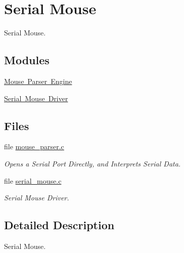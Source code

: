 \hypertarget{group__libmisc__mouse}{}\section{Serial Mouse}
\label{group__libmisc__mouse}


Serial Mouse.  


\subsection*{Modules}
\begin{DoxyCompactItemize}
\item 
\mbox{\hyperlink{group__libmisc__mouseparser}{Mouse Parser Engine}}
\item 
\mbox{\hyperlink{group__libmisc__serialmouse}{Serial Mouse Driver}}
\end{DoxyCompactItemize}
\subsection*{Files}
\begin{DoxyCompactItemize}
\item 
file \mbox{\hyperlink{mouse__parser_8c}{mouse\+\_\+parser.\+c}}
\begin{DoxyCompactList}\small\item\em Opens a Serial Port Directly, and Interprets Serial Data. \end{DoxyCompactList}\item 
file \mbox{\hyperlink{serial__mouse_8c}{serial\+\_\+mouse.\+c}}
\begin{DoxyCompactList}\small\item\em Serial Mouse Driver. \end{DoxyCompactList}\end{DoxyCompactItemize}


\subsection{Detailed Description}
Serial Mouse. 

